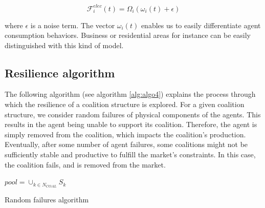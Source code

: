 \documentclass[journal]{IEEEtran}
\begin{document}
\begin{equation}
\mathcal{F}_{i}^{elec}(t) = \Omega_{i} ( \omega_{i}(t) + \epsilon )
\end{equation}


\noindent where $ \epsilon $ is a noise term. The vector $ \omega_{i}(t) $ enables us to easily differentiate agent consumption behaviors. Business or residential areas for instance can be easily distinguished with this kind of model.




\subsection{Resilience algorithm}
\label{appendix_resilience}

The following algorithm (see algorithm \ref{alg:algo4}) explains the process through which the resilience of a coalition structure is explored. For a given coalition structure, we consider random failures of physical components of the agents. This results in the agent being unable to support its coalition. Therefore, the agent is simply removed from the coalition, which impacts the coalition's production. Eventually, after some number of agent failures, some coalitions might not be sufficiently stable and productive to fulfill the market's constraints. In this case, the coalition fails, and is removed from the market.


\begin{algorithm}
	
	$ pool = \cup_{k \in N_{COAL}} S_k $ \; 
	\caption{Random failures algorithm}
\label{alg:algo4}
\end{algorithm}



\end{document}
